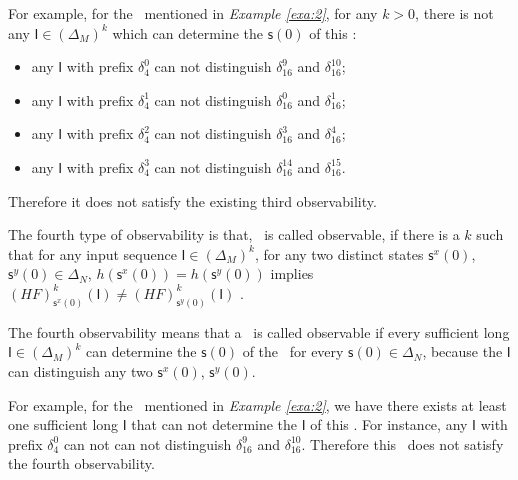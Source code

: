 \begin{example}
For example, for the \BCN\ mentioned in {\em Example \ref{exa:2}}, for any $k>0$, there is not any $\mathsf{I}\in(\Delta_M)^k$ which can determine the $\mathsf{s}(0)$ of this \BCN:
\begin{itemize}
  \item any $\mathsf{I}$ with prefix $\delta_{4}^0$ can not distinguish $\delta_{16}^9$ and $\delta_{16}^{10}$;
  \item any $\mathsf{I}$ with prefix $\delta_{4}^1$ can not distinguish $\delta_{16}^0$ and $\delta_{16}^{1}$;
  \item any $\mathsf{I}$ with prefix $\delta_{4}^2$ can not distinguish $\delta_{16}^3$ and $\delta_{16}^{4}$;
  \item any $\mathsf{I}$ with prefix $\delta_{4}^3$ can not distinguish $\delta_{16}^{14}$ and $\delta_{16}^{15}$.
\end{itemize} 
Therefore it does not satisfy the existing third observability. 
\label{exa:6}
\end{example}  
\begin{definition}
	The fourth type of observability is that, \BCN\ is called observable, if there is a $k$ such that for any input sequence $\mathsf{I}\in(\Delta_M)^{k}$, for any two distinct states $\mathsf{s}^{x}(0)$, $\mathsf{s}^{y}(0) \in \Delta_N$, $h(\mathsf{s}^{x}(0))=h(\mathsf{s}^{y}(0))$ implies $(HF)^{k}_{\mathsf{s}^{x}(0)}(\mathsf{I})\neq (HF)^{k}_{\mathsf{s}^{y}(0)}(\mathsf{I})$ \cite{Fornasini2013Observability}.
\end{definition}

The fourth observability means that a \BCN\ is called observable if every sufficient long $\mathsf{I}\in(\Delta_M)^{k}$ can determine the $\mathsf{s}(0)$ of the \BCN\ for every $\mathsf{s}(0)\in\Delta_N$, because the $\mathsf{I}$ can distinguish any two $\mathsf{s}^{x}(0)$, $\mathsf{s}^{y}(0)$.%
\begin{example}
For example, for the \BCN\ mentioned in {\em Example \ref{exa:2}}, we have there exists at least one sufficient long $\mathsf{I}$ that can not determine the $\mathsf{I}$ of this \BCN. For instance, any $\mathsf{I}$ with prefix $\delta_{4}^0$ can not can not distinguish $\delta_{16}^9$ and $\delta_{16}^{10}$. 
Therefore this \BCN\ does not satisfy the fourth observability. 
\label{exa:7}
\end{example}  

